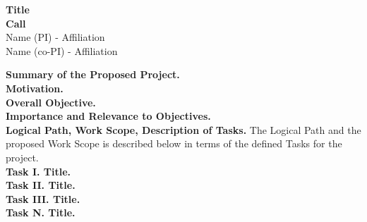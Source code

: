 \documentclass[11pt,letterpaper]{article}
\begin{document}
{\centering 
    \textbf{Title\\
    Call\\
    }
    Name (PI) - Affiliation\\
    Name (co-PI) - Affiliation 
\par
}
\vspace{\baselineskip}

\noindent\textbf{Summary of the Proposed Project.} 
\\

\noindent\textbf{Motivation.}
\\

\noindent\textbf{Overall Objective.}
\\

\noindent\textbf{Importance and Relevance to Objectives.}
\\

\noindent\textbf{Logical Path, Work Scope, Description of Tasks.} The Logical Path and the proposed Work Scope is described below in terms of the defined Tasks for the project.
\\

\noindent\textbf{Task I. Title.}
\\

\noindent\textbf{Task II. Title.}
\\

\noindent\textbf{Task III. Title.}
\\

\noindent\textbf{Task N. Title.}
\\
\end{document}
